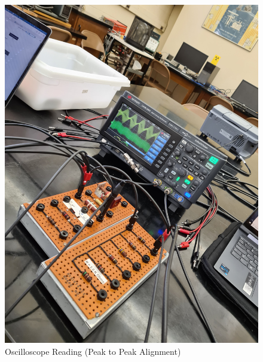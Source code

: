\documentclass[a4paper,12pt]{article}
\begin{document}
\begin{figure}[H]
  \centering
  \includegraphics[width=1.0\linewidth]{../data/20211116_103322.jpg}    
  \begin{center}
    \begin{center}   
    \end{center}  \end{center}
  \caption{Oscilloscope Reading (Peak to Peak Alignment)}
  \label{osc}
\end{figure}
\end{document}
